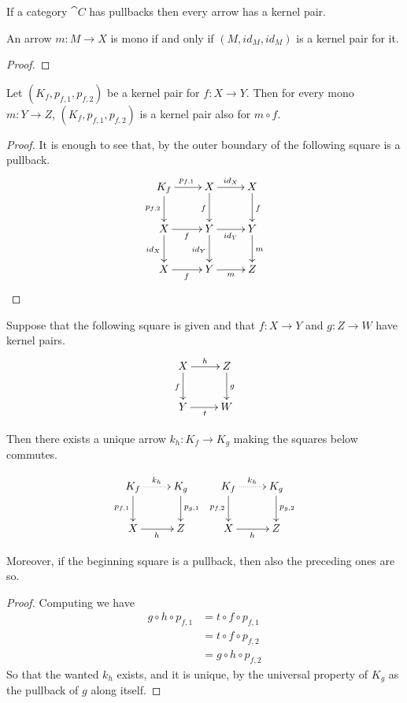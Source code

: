{\begin{remark}
	If a category $\cat{C}$ has pullbacks then every arrow has a kernel pair.
\end{remark}


\begin{prop}\label{prop:kermono}
	An arrow $m\colon M\to X$ is mono if and only if $(M, id_M, id_M)$ is a kernel pair for it.
\end{prop}
\begin{proof}
\end{proof}

\begin{cor}\label{cor:kermono}
	Let $(K_f, p_{f,1}, p_{f,2})$ be a kernel pair for $f\colon X\to Y$. Then for every mono $m\colon Y\to Z$, $(K_f, p_{f,1}, p_{f,2})$ is a kernel pair also for $m\circ f$.
\end{cor}
\begin{proof}
	It is enough to see that, by  the outer boundary of the following square is a pullback.
	\[\xymatrix{K_f\ar[r]^{p_{f,1}}  \ar[d]_{p_{f,2}}& X \ar[r]^{id_X} \ar[d]_{f}&X\ar[d]^{f} \\X \ar[d]_{id_X} \ar[r]_{f} & Y \ar[d]_{id_Y} \ar[r]_{id_Y}& Y \ar[d]^{m}\\X \ar[r]_{f} & Y \ar[r]_{m} & Z}\]
	
\end{proof}

\begin{lemma}\label{lem:salvavita1}
Suppose that the following square is given and that $f\colon X\to Y$ and $g\colon Z\to W$ have kernel pairs.
\[\xymatrix{X \ar[d]_{f}\ar[r]^{h}& Z \ar[d]^{g} \\ Y \ar[r]_{t}& W}\]

Then there exists a unique arrow $k_h\colon K_f\to K_g$ making the squares below commutes.

\[\xymatrix{K_f \ar[d]_{p_{f, 1}}\ar@{.>}[r]^{k_h}& K_g \ar[d]^{p_{g,1}} & K_f \ar[d]_{p_{f,2}}\ar@{.>}[r]^{k_h}& K_g \ar[d]^{p_{g,2}} \\ X \ar[r]_{h}& Z & X \ar[r]_{h}& Z}\]

Moreover, if the beginning square is a pullback, then also the preceding ones are so.
\end{lemma}
\begin{proof}
	Computing we have
	\begin{align*}
		g\circ h\circ p_{f,1}&=t\circ f\circ p_{f,1}\\&=t\circ f\circ p_{f,2}\\&=g\circ h\circ p_{f,2}
	\end{align*}
	So that the wanted $k_h$ exists, and it is unique, by the universal property of $K_g$ as the pullback of $g$ along itself. 
	

\end{proof}}
